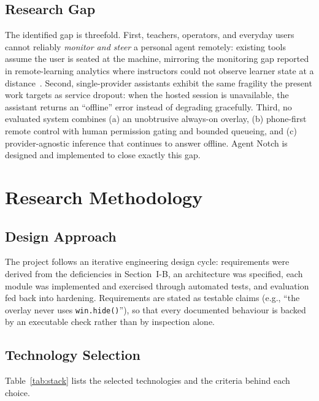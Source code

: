 \documentclass[conference]{IEEEtran}
\begin{document}
\subsection{Research Gap}

The identified gap is threefold. First, teachers, operators, and
everyday users cannot reliably \emph{monitor and steer} a
personal agent remotely: existing tools assume the user is
seated at the machine, mirroring the monitoring gap reported in
remote-learning analytics where instructors could not observe
learner state at a distance~\cite{eddata,dropout}. Second, single-provider assistants
exhibit the same fragility the present work targets as service
dropout: when the hosted session is unavailable, the assistant
returns an ``offline'' error instead of degrading gracefully.
Third, no evaluated system combines (a) an unobtrusive
always-on overlay, (b) phone-first remote control with human
permission gating and bounded queueing, and (c)
provider-agnostic inference that continues to answer offline.
Agent Notch is designed and implemented to close exactly this
gap.


\section{Research Methodology}

\subsection{Design Approach}

The project follows an iterative engineering design cycle:
requirements were derived from the deficiencies in
Section~I-B, an architecture was specified, each module was
implemented and exercised through automated tests, and evaluation
fed back into hardening. Requirements are stated as testable
claims (e.g., ``the overlay never uses \texttt{win.hide()}''),
so that every documented behaviour is backed by an executable
check rather than by inspection alone.

\subsection{Technology Selection}

Table~\ref{tab:stack} lists the selected technologies and the
criteria behind each choice.
\end{document}
